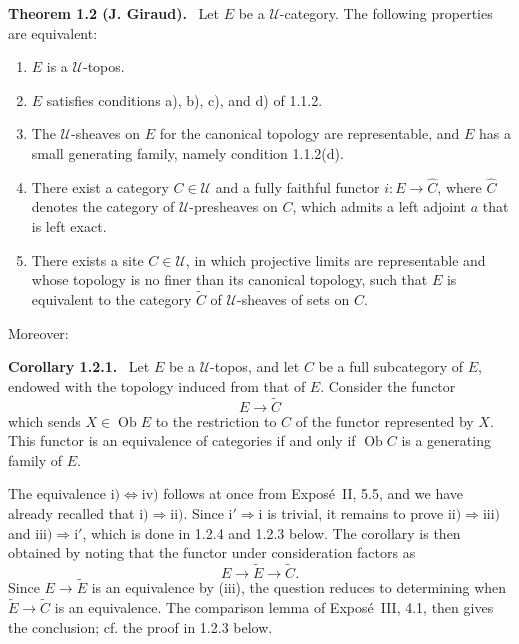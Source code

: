 \documentclass[11pt]{article}
\newcommand{\U}{\mathcal{U}}
\newcommand{\Ob}{\operatorname{Ob}}
\newenvironment{statement}[1]{\par\medskip\noindent\textbf{#1.}\ }{\par\medskip}
\providecommand{\Ob}{\operatorname{Ob}}
\begin{document}
\begin{statement}{Theorem 1.2 (J. Giraud)}
Let \(E\) be a \(\U\)-category. The following properties are equivalent:
\begin{enumerate}[label=\roman*)]
\item \(E\) is a \(\U\)-topos.
\item \(E\) satisfies conditions a), b), c), and d) of 1.1.2.
\item The \(\U\)-sheaves on \(E\) for the canonical topology are representable, and \(E\) has a small generating family, namely condition 1.1.2(d).
\item There exist a category \(C\in\U\) and a fully faithful functor \(i:E\to\widehat C\), where \(\widehat C\) denotes the category of \(\U\)-presheaves on \(C\), which admits a left adjoint \(a\) that is left exact.
\item[\({\rm i'}\)] There exists a site \(C\in\U\), in which projective limits are representable and whose topology is no finer than its canonical topology, such that \(E\) is equivalent to the category \(\widetilde C\) of \(\U\)-sheaves of sets on \(C\).
\end{enumerate}
\end{statement}

Moreover:

\begin{statement}{Corollary 1.2.1}
Let \(E\) be a \(\U\)-topos, and let \(C\) be a full subcategory of \(E\), endowed with the topology induced from that of \(E\). Consider the functor
\[
E\longrightarrow \widetilde C
\]
which sends \(X\in\Ob E\) to the restriction to \(C\) of the functor represented by \(X\). This functor is an equivalence of categories if and only if \(\Ob C\) is a generating family of \(E\).
\end{statement}

The equivalence \(\mathrm{i)}\Leftrightarrow\mathrm{iv)}\) follows at once from Expos\'e~II, 5.5, and we have already recalled that \(\mathrm{i)}\Rightarrow\mathrm{ii)}\). Since \(\mathrm{i'}\Rightarrow\mathrm{i}\) is trivial, it remains to prove \(\mathrm{ii)}\Rightarrow\mathrm{iii)}\) and \(\mathrm{iii)}\Rightarrow\mathrm{i'}\), which is done in 1.2.4 and 1.2.3 below. The corollary is then obtained by noting that the functor under consideration factors as
\[
E\longrightarrow \widetilde E\longrightarrow \widetilde C.
\]
Since \(E\to\widetilde E\) is an equivalence by (iii), the question reduces to determining when \(\widetilde E\to\widetilde C\) is an equivalence. The comparison lemma of Expos\'e~III, 4.1, then gives the conclusion; cf. the proof in 1.2.3 below.
\end{document}
